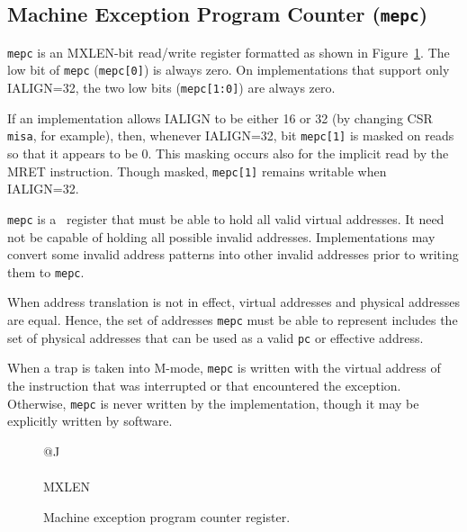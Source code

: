 \subsection{Machine Exception Program Counter ({\tt mepc})}

{\tt mepc} is an MXLEN-bit read/write register formatted as shown in
Figure~\ref{mepcreg}.  The low bit of {\tt mepc} ({\tt mepc[0]}) is
always zero.  On implementations that support only IALIGN=32, the two low bits
({\tt mepc[1:0]}) are always zero.

If an implementation allows IALIGN to be either 16 or 32 (by
changing CSR {\tt misa}, for example), then, whenever IALIGN=32, bit
{\tt mepc[1]} is masked on reads so that it appears to be 0.  This
masking occurs also for the implicit read by the MRET instruction.
Though masked, {\tt mepc[1]} remains writable when IALIGN=32.

{\tt mepc} is a \warl\ register that must be able to hold all valid
virtual addresses.  It need not be capable of holding all possible invalid
addresses.  Implementations may convert some invalid address patterns into
other invalid addresses prior to writing them to {\tt mepc}.

\begin{commentary}
When address translation is not in effect, virtual addresses and physical
addresses are equal.
Hence, the set of addresses {\tt mepc} must be able to represent includes the
set of physical addresses that can be used as a valid {\tt pc} or effective
address.
\end{commentary}

When a trap is taken into M-mode, {\tt mepc} is written with the
virtual address of the instruction that was interrupted or that
encountered the exception.  Otherwise, {\tt mepc} is never written by
the implementation, though it may be explicitly written by software.

\begin{figure}[h!]
{\footnotesize
\begin{center}
\begin{tabular}{@{}J}
 \\
\hline
{} \\
\hline
MXLEN \\
\end{tabular}
\end{center}
}
\vspace{-0.1in}
\caption{Machine exception program counter register.}
\label{mepcreg}
\end{figure}

